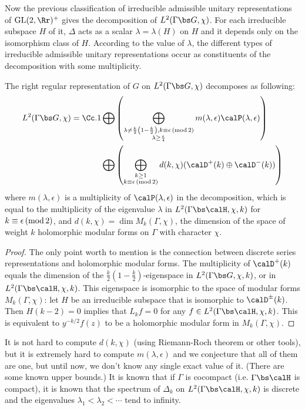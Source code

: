 Now the previous classification of irreducible admissible unitary representations of $\GL(2, \Rr)^{+}$ gives the decomposition of $L^{2}(\Gamma \bs G, \chi)$. 
For each irreducible subspace $H$ of it, $\Delta$ acts as a scalar $\lambda = \lambda(H)$ on $H$ and it depends only on the isomorphism class of $H$. According to the value of $\lambda$, the different types of irreducible admissible unitary representations occur as constituents of the decomposition with some multiplicity. 
\begin{theorem}
The right regular representation of $G$ on $L^{2}(\Gamma \bs G, \chi)$ decomposes as following:
\begin{align*}
L^{2}(\Gamma \bs G, \chi) = \Cc.1 &\bigoplus \left( \bigoplus_{\substack{\lambda \neq \frac{k}{2}\left(1-\frac{k}{2}\right), k\equiv \epsilon \Mod{2}\\ \lambda \geq \frac{\epsilon}{4}}} m(\lambda, \epsilon) \calP(\lambda, \epsilon)\right) \\&\bigoplus \left(\bigoplus_{\substack{k\geq 1 \\ k\equiv \epsilon \Mod{2}}}d(k, \chi) (\calD^{+}(k) \oplus \calD^{-}(k))\right)
\end{align*}
where $m(\lambda, \epsilon)$ is a multiplicity of $\calP(\lambda, \epsilon)$ in the decomposition, which is equal to the multiplicity of the eigenvalue $\lambda$ in $L^{2}(\Gamma\bs\calH, \chi, k)$ for $k\equiv \epsilon\,(\mathrm{mod}\,2)$, and $d(k, \chi) = \dim M_{k}(\Gamma, \chi)$, the dimension of the space of weight $k$ holomorphic modular forms on $\Gamma$ with character $\chi$. 
\end{theorem}
\begin{proof}
The only point worth to mention is the connection between discrete series representations and holomorphic modular forms. The multiplicity of $\calD^{+}(k)$ equals the dimension of the $\frac{k}{2}\left( 1- \frac{k}{2}\right)$-eigenspace in $L^{2}(\Gamma\bs G, \chi, k)$, or in $L^{2}(\Gamma \bs \calH, \chi, k)$. This eigenspace is isomorphic to the space of modular forms $M_{k}(\Gamma, \chi)$: let $H$ be an irreducible subspace that is isomorphic to $\calD^{\pm}(k)$. 
Then $H(k-2) = 0$ implies that $L_{k}f = 0$ for any $f\in L^{2}(\Gamma \bs \calH, \chi, k)$. This is equivalent to $y^{-k/2}f(z)$ to be a holomorphic modular form in $M_{k}(\Gamma, \chi)$. 
\end{proof}
It is not hard to compute $d(k, \chi)$ (using Riemann-Roch theorem or other tools), but it is extremely hard to compute $m(\lambda, \epsilon)$ and we conjecture that all of them are one, but until now, we don't know any single exact value of it. (There are some known upper bounds.) 
It is known that  if $\Gamma$ is cocompact (i.e. $\Gamma \bs \calH$ is compact), it is known that the spectrum of $\Delta_k$ on $L^{2}(\Gamma\bs\calH, \chi, k)$ is discrete and the eigenvalues $ \lambda_1 < \lambda_2 < \cdots$ tend to infinity. 

